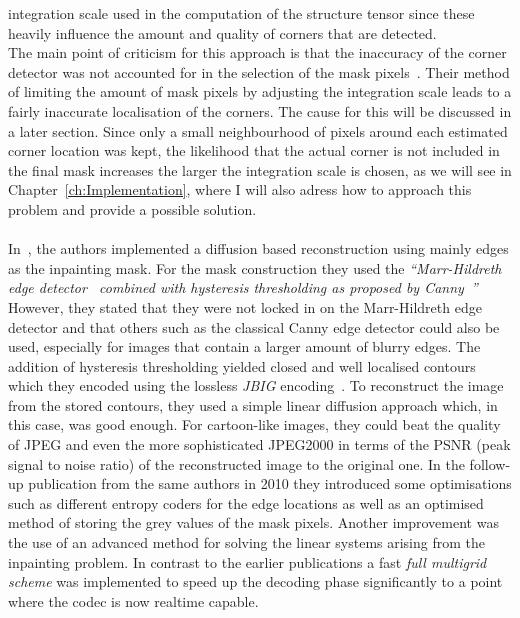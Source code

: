 integration scale used in the computation of the structure tensor since these heavily influence the
amount and quality of corners that are detected. \\
The main point of criticism for this approach is that the inaccuracy of the corner 
detector was not accounted for in the selection of the mask
pixels~\cite{conversation}. Their method of limiting the amount of mask pixels by adjusting the integration scale leads
to a fairly inaccurate localisation of the corners. The cause for this will be discussed in
a later section.
Since only a small neighbourhood of pixels around each estimated corner
location was kept, the likelihood that the actual corner is not included in the final mask
increases the larger the integration scale is chosen, as we will see in Chapter~\ref{ch:Implementation}, 
where I will also adress how to approach this problem and provide a possible solution.\\
\\
In~\cite{mainberger09, mainberger10}, the authors implemented a diffusion based reconstruction
using mainly edges as the inpainting mask. For the mask construction they used the \textit{\enquote{Marr-Hildreth
edge detector~\cite{marr80} combined with hysteresis thresholding as proposed by
Canny~\cite{canny86}}}~\cite{mainberger09}
However, they stated that they were not locked in on the Marr-Hildreth edge detector and that
others such as the classical Canny edge detector could also be used, especially for images that
contain a larger amount of blurry edges. The addition of hysteresis thresholding yielded closed and
well localised contours which they encoded using the lossless \textit{JBIG} encoding~\cite{jbig}.
To reconstruct the image from the stored contours, they used a simple linear diffusion approach
which, in this case, was good enough. For cartoon-like images, they could beat the quality of
JPEG and even the more sophisticated JPEG2000 in terms of the PSNR (peak signal to noise ratio) of the reconstructed image to the
original one. In the follow-up publication from the same authors in 2010 they introduced some 
optimisations such as different
entropy coders for the edge locations as well as an optimised method of storing the grey
values of the mask pixels. Another improvement was the use of an advanced method for solving the
linear systems arising from the inpainting problem. In contrast to the earlier publications a fast
\textit{full multigrid scheme} was implemented to speed up the decoding phase significantly to 
a point where the codec is now realtime capable.\\
